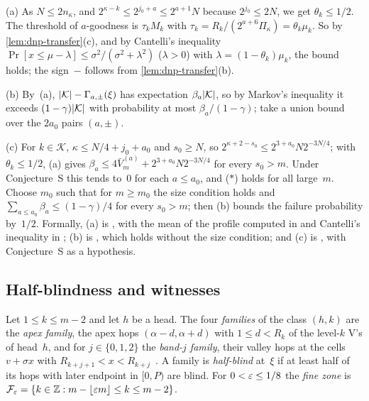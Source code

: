 \begin{outline}
(a) As $N\le2n_\kappa$, and $2^{\kappa-k}\le2^{j_0+a}\le2^{a+1}N$ because $2^{j_0}\le2N$, we get
$\theta_k\le1/2$. The threshold of $a$-goodness is $\tau_kM_k$ with $\tau_k=R_k/(2^{a+6}\Pi_\kappa)=\theta_k\mu_k$. So by \cref{lem:dnp-transfer}(c), and by Cantelli's inequality
$\Pr[x\le\mu-\lambda]\le\sigma^2/(\sigma^2+\lambda^2)$ ($\lambda>0$) with $\lambda=(1-\theta_k)\mu_k$, the bound holds; the
sign~$-$ follows from \cref{lem:dnp-transfer}(b).

(b) By~(a), $\lvert \mathcal K \rvert-\Gamma_{a,\pm}(\xi)$ has expectation $\beta_a\lvert \mathcal K \rvert$, so by Markov's inequality it
exceeds $(1-\gamma)\lvert \mathcal K \rvert$ with probability at most $\beta_a/(1-\gamma)$; take a union bound over the $2a_0$
pairs $(a,\pm)$.

(c) For $k\in\mathcal K$, $\kappa\le N/4+j_0+a_0$ and $s_0\ge N$, so $2^{\kappa+2-s_0}\le2^{3+a_0}N2^{-3N/4}$; with
$\theta_k\le1/2$, (a) gives $\beta_a\le4\bar V^{(a)}_m+2^{3+a_0}N2^{-3N/4}$ for every $s_0>m$. Under Conjecture~S this
tends to~$0$ for each $a\le a_0$, and \textup{($\ast$)} holds for all large~$m$. Choose $m_0$ such that for $m\ge m_0$
the size condition holds and $\sum_{a\le a_0}\beta_a\le(1-\gamma)/4$ for every $s_0>m$; then (b) bounds the failure
probability by~$1/2$.
Formally, (a) is , with the mean of the profile computed in
 and Cantelli's inequality in ; (b) is
, which holds without the size condition; and (c) is
, with Conjecture~S as a hypothesis.
\end{outline}

\subsection{Half-blindness and witnesses}\label{sec:dnp-witness}

\begin{definition}\label{def:dnp-family}
Let $1\le k\le m-2$ and let $h$ be a head. The four \emph{families} of the class $(h,k)$ are the \emph{apex family}, the
apex hops $(\alpha-d,\alpha+d)$ with $1\le d<R_k$ of the level-$k$ V's of head~$h$, and for $j\in\{0,1,2\}$ the
\emph{band-$j$ family}, their valley hops at the cells $v+\sigma x$ with
$R_{k+j+1}<x<R_{k+j}$~\cite[Lemma~5.1(b)]{BoundedNesting2026}. A family is \emph{half-blind} at~$\xi$ if at least half of
its hops with later endpoint in $[0,P)$ are blind. For $0<\varepsilon\le1/8$ the \emph{fine zone} is
$\mathcal F_\varepsilon=\{k\in\mathbb{Z}:m-\lfloor\varepsilon m\rfloor\le k\le m-2\}$.
\end{definition}

